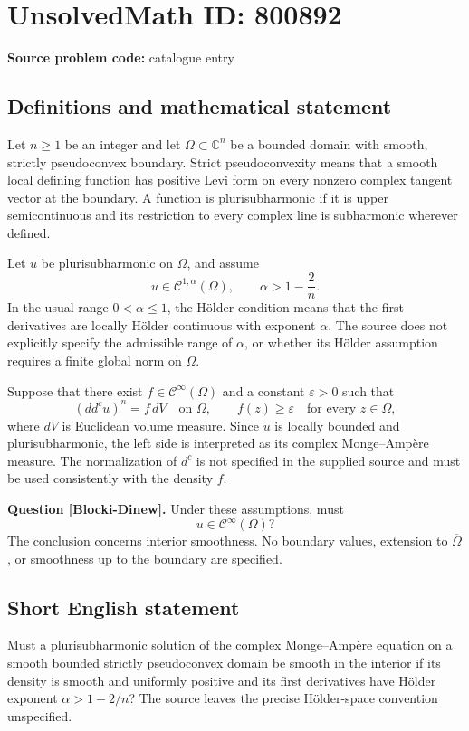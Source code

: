 \documentclass[11pt]{article}
\newcommand{\C}{\mathbb{C}}
\begin{document}
\section*{UnsolvedMath ID: 800892}
\textbf{Source problem code:} catalogue entry
\subsection{Definitions and mathematical statement}
Let \(n\geq 1\) be an integer and let \(\Omega\subset\C^n\) be a bounded domain with smooth, strictly pseudoconvex boundary. Strict pseudoconvexity means that a smooth local defining function has positive Levi form on every nonzero complex tangent vector at the boundary. A function is plurisubharmonic if it is upper semicontinuous and its restriction to every complex line is subharmonic wherever defined.

Let \(u\) be plurisubharmonic on \(\Omega\), and assume
\[
u\in\mathcal C^{1,\alpha}(\Omega),\qquad \alpha>1-\frac{2}{n}.
\]
In the usual range \(0<\alpha\leq 1\), the Hölder condition means that the first derivatives are locally Hölder continuous with exponent \(\alpha\). The source does not explicitly specify the admissible range of \(\alpha\), or whether its Hölder assumption requires a finite global norm on \(\Omega\).

Suppose that there exist \(f\in\mathcal C^\infty(\Omega)\) and a constant \(\varepsilon>0\) such that
\[
(dd^c u)^n=f\,dV\quad\text{on }\Omega,
\qquad f(z)\geq\varepsilon\quad\text{for every }z\in\Omega,
\]
where \(dV\) is Euclidean volume measure. Since \(u\) is locally bounded and plurisubharmonic, the left side is interpreted as its complex Monge--Ampère measure. The normalization of \(d^c\) is not specified in the supplied source and must be used consistently with the density \(f\).

\textbf{Question [Blocki-Dinew].} Under these assumptions, must
\[
u\in\mathcal C^\infty(\Omega)?
\]
The conclusion concerns interior smoothness. No boundary values, extension to \(\overline\Omega\), or smoothness up to the boundary are specified.
\subsection{Short English statement}
Must a plurisubharmonic solution of the complex Monge--Ampère equation on a smooth bounded strictly pseudoconvex domain be smooth in the interior if its density is smooth and uniformly positive and its first derivatives have Hölder exponent \(\alpha>1-2/n\)? The source leaves the precise Hölder-space convention unspecified.
\end{document}
